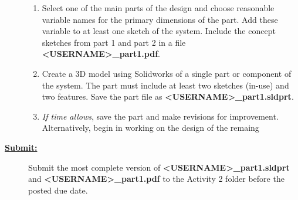 \documentclass[12pt]{article}
\newcommand{\ANUM}{2} %
\begin{document}
\begin{description}
\begin{enumerate}
	\item Select one of the main parts of the design and choose reasonable variable names for the primary dimensions of the part. Add these variable to at least one sketch of the system. Include the concept sketches from part 1 and part 2 in a file\\ {\bf \BL<USERNAME>\BK\_part1.pdf}. 
	
	\item Create a 3D model using Solidworks of a single part or component of the system. The part must include at least two sketches (in-use) and two features. Save the part file as {\bf \BL<USERNAME>\BK\_part1.sldprt}. 
	
	\item {\it If time allows}, save the part and make revisions for improvement. Alternatively, begin in working on the design of the remaing 
\end{enumerate}

\item[\textbf{\underline{Submit:}}] \hfill \vspace{0mm}

		Submit the most complete version of {\bf \BL<USERNAME>\BK\_part1.sldprt} \\and {\bf \BL<USERNAME>\BK\_part1.pdf } to the Activity \ANUM \hspace{1mm} folder before the posted due date.

\end{description}
\end{document}
